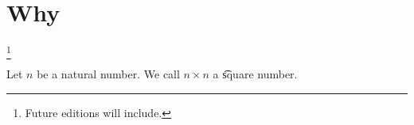 
\section{Why}\footnote{Future editions will include.}



Let $n$ be a natural number.
We call $n\times n$ a \t{square number}.

\blankpage
